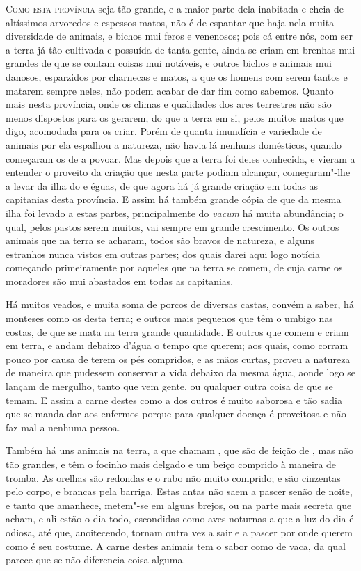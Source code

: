 \noindent\textsc{Como esta província} seja tão grande, e a maior parte dela inabitada e
cheia de altíssimos arvoredos e espessos matos, não é de espantar que
haja nela muita diversidade de animais, e bichos mui feros e venenosos;
pois cá entre nós, com ser a terra já tão cultivada e possuída de tanta
gente, ainda se criam em brenhas  mui grandes de que se contam
coisas mui notáveis, e outros bichos e animais mui danosos, esparzidos
por charnecas e matos, a que os homens com serem tantos e matarem
sempre neles, não podem acabar de dar fim como sabemos. Quanto mais
nesta província, onde os climas e qualidades dos ares terrestres não
são menos dispostos para os gerarem, do que a terra em si, pelos muitos
matos que digo, acomodada para os criar. Porém de quanta imundícia e
variedade de animais por ela espalhou a natureza, não havia lá nenhuns
domésticos, quando começaram os  de a povoar. Mas depois que
a terra foi deles conhecida, e vieram a entender o proveito da criação
que nesta parte podiam alcançar, começaram"-lhe a levar da ilha do   e éguas, de que agora há já grande criação em todas as
capitanias desta província. E assim há também grande cópia de  que
da mesma ilha foi levado a estas partes, principalmente do \textit{vacum} há
muita abundância; o qual, pelos pastos serem muitos, vai sempre em
grande crescimento. Os outros animais que na terra se acharam, todos
são bravos de natureza, e alguns estranhos nunca vistos em outras
partes; dos quais darei aqui logo notícia começando primeiramente por
aqueles que na terra se comem, de cuja carne os moradores são mui
abastados em todas as capitanias.

Há muitos veados, e muita soma de porcos de diversas castas, convém a
saber, há monteses como os desta terra; e outros mais pequenos que têm
o umbigo nas costas, de que se mata na terra grande quantidade. E
outros que comem e criam em terra, e andam debaixo
d'água o tempo que querem; aos quais, como corram
pouco por causa de terem os pés compridos, e as mãos curtas, proveu a \EP
natureza de maneira que pudessem conservar a vida debaixo da mesma
água, aonde logo se lançam de mergulho, tanto que vem gente, ou
qualquer outra coisa de que se temam. E assim a carne destes como a dos
outros é muito saborosa e tão sadia que se manda dar aos enfermos		%
porque para qualquer doença é proveitosa e não faz mal a nenhuma
pessoa.

Também há uns animais na terra, a que chamam , que são de feição de
, mas não tão grandes, e têm o focinho mais delgado e um beiço
comprido à maneira de tromba. As orelhas são redondas e o rabo não
muito comprido; e são cinzentas pelo corpo, e brancas pela barriga.
Estas antas não saem a pascer senão de noite, e tanto que amanhece,
metem"-se em alguns brejos, ou na parte mais secreta que acham, e ali
estão o dia todo, escondidas como aves noturnas a que a luz do dia é
odiosa, até que, anoitecendo, tornam outra vez a sair e a pascer por onde
querem como é seu costume. A carne destes animais tem o sabor como de
vaca, da qual parece que se não diferencia coisa alguma.				%

